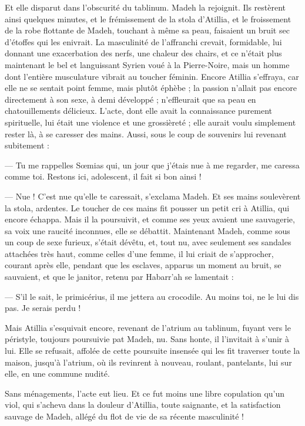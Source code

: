 \documentclass[a4paper, 11pt, oneside, polutonikogreek, french]{article}
\begin{document}
Et elle disparut dans l'obscurité du tablinum. Madeh la rejoignit. Ils restèrent ainsi quelques minutes, et le frémissement de la stola d'Atillia, et le froissement de la robe flottante de Madeh, touchant à même sa peau, faisaient un bruit sec d'étoffes qui les enivrait. La masculinité de l'affranchi crevait, formidable, lui donnant une exacerbation des nerfs, une chaleur des chairs, et ce n'était plus maintenant le bel et languissant Syrien voué à la Pierre-Noire, mais un homme dont l'entière musculature vibrait au toucher féminin. Encore Atillia s'effraya, car elle ne se sentait point femme, mais plutôt éphèbe ; la passion n'allait pas encore directement à son sexe, à demi développé ; n'effleurait que sa peau en chatouillements délicieux. L'acte, dont elle avait la connaissance purement spirituelle, lui était une violence et une grossièreté ; elle aurait voulu simplement rester là, à se caresser des mains. Aussi, sous le coup de souvenirs lui revenant subitement :

--- Tu me rappelles Sœmias qui, un jour que j'étais nue à me regarder, me caressa comme toi. Restons ici, adolescent, il fait si bon ainsi !

--- Nue ! C'est nue qu'elle te caressait, s'exclama Madeh. Et ses mains soulevèrent la stola, ardentes. Le toucher de ces mains fit pousser un petit cri à Atillia, qui encore échappa. Mais il la poursuivit, et comme ses yeux avaient une sauvagerie, sa voix une raucité inconnues, elle se débattit. Maintenant Madeh, comme sous un coup de sexe furieux, s'était dévêtu, et, tout nu, avec seulement ses sandales attachées très haut, comme celles d'une femme, il lui criait de s'approcher, courant après elle, pendant que les esclaves, apparus un moment au bruit, se sauvaient, et que le janitor, retenu par Habarr'ah se lamentait :

--- S'il le sait, le primicérius, il me jettera au crocodile. Au moins toi, ne le lui dis pas. Je serais perdu !

Mais Atillia s'esquivait encore, revenant de l'atrium au tablinum, fuyant vers le péristyle, toujours poursuivie pat Madeh, nu. Sans honte, il l'invitait à s'unir à lui. Elle se refusait, affolée de cette poursuite insensée qui les fit traverser toute la maison, jusqu'à l'atrium, où ils revinrent à nouveau, roulant, pantelants, lui sur elle, en une commune nudité.

Sans ménagements, l'acte eut lieu. Et ce fut moins une libre copulation qu'un viol, qui s'acheva dans la douleur d'Atillia, toute saignante, et la satisfaction sauvage de Madeh, allégé du flot de vie de sa récente masculinité !
\clearpage
\end{document}
